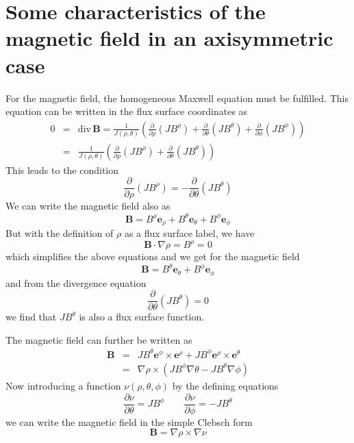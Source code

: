 \documentclass[12pt]{report}
\renewcommand{\div}{\mbox{div}\,}
\begin{document}
\section{Some characteristics of the magnetic field in an
  axisymmetric case}
\label{sec:charar_genBfield}

For the magnetic field, the homogeneous Maxwell equation must be
fulfilled. This equation can be written in the flux surface
coordinates as
\begin{eqnarray*}
  0&=&\div \mathbf{B}=\frac{1}{J(\rho,\theta)}\left(
    \frac{\partial}{\partial \rho} (JB^\rho)
    +\frac{\partial}{\partial \theta} (JB^\theta)
    +\frac{\partial}{\partial \phi} (JB^\phi)
  \right)\\
  &=&\frac{1}{J(\rho,\theta)}\left(
    \frac{\partial}{\partial \rho} (JB^\rho)
    +\frac{\partial}{\partial \theta} (JB^\theta)
  \right)
\end{eqnarray*}
This leads to the condition
\begin{displaymath}
  \frac{\partial}{\partial \rho} (JB^\rho)
  =-\frac{\partial}{\partial \theta} (JB^\theta)
\end{displaymath}
We can write the magnetic field also as
\begin{displaymath}
  \mathbf{B}=B^\rho\mathbf{e}_\rho+B^\theta\mathbf{e}_\theta
  +B^\phi\mathbf{e}_\phi
\end{displaymath}
But with the definition of $\rho$ as a flux surface label, we have 
\begin{displaymath}
  \mathbf{B}\cdot\nabla\rho=B^\rho=0
\end{displaymath}
which simplifies the above equations and we get for the magnetic field
\begin{displaymath}
  \mathbf{B}=B^\theta\mathbf{e}_\theta+B^\phi\mathbf{e}_\phi
\end{displaymath}
and from the divergence equation
\begin{displaymath}
  \frac{\partial}{\partial \theta} (JB^\theta)=0
\end{displaymath}
we find that $JB^\theta$ is also a flux surface function.

The magnetic field can further be written as
\begin{eqnarray*}
  \mathbf{B} &=& JB^\theta \mathbf{e}^\phi\times \mathbf{e}^\rho
  +JB^\phi \mathbf{e}^\rho\times\mathbf{e}^\theta\\
  &=& \nabla\rho\times\left(
    JB^\phi \nabla\theta
    -JB^\theta \nabla\phi
  \right)
\end{eqnarray*}
Now introducing a function $\nu(\rho,\theta,\phi)$ by the defining
equations
\begin{displaymath}
  \frac{\partial \nu}{\partial\theta}=JB^\phi
  \qquad  \frac{\partial \nu}{\partial\phi}=-JB^\theta
\end{displaymath}
we can write the magnetic field in the simple Clebsch form
\begin{displaymath}
  \mathbf{B}=\nabla\rho\times\nabla\nu
\end{displaymath}
\end{document}
